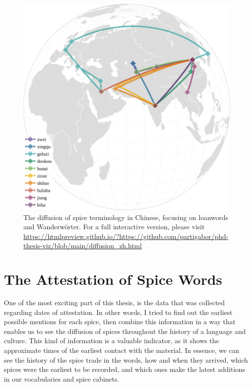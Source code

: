 \begin{figure}[ht!]
    \includegraphics[width=\linewidth]{imgs/plots/diffusion_zh.pdf}
    \caption{The diffusion of spice terminology in Chinese, focusing on loanwords and Wanderwörter. For a full interactive version, please visit \url{https://htmlpreview.github.io/?https://github.com/partigabor/phd-thesis-viz/blob/main/diffusion_zh.html}}
    \label{fig:diffusion_zh}
\end{figure}



\section{The Attestation of Spice Words}

One of the most exciting part of this thesis, is the data that was collected regarding dates of attestation. In other words, I tried to find out the earliest possible mentions for each spice, then combine this information in a way that enables us to see the diffusion of spices throughout the history of a language and culture. This kind of information is a valuable indicator, as it shows the approximate times of the earliest contact with the material. In essence, we can see the history of the spice trade in the words, how and when they arrived, which spices were the earliest to be recorded, and which ones make the latest additions in our vocabularies and spice cabinets. 

